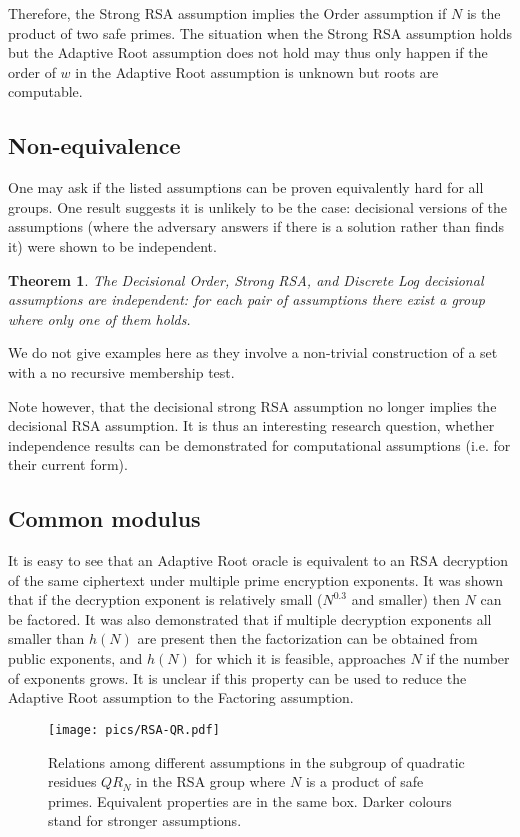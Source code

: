 \documentclass[a4paper]{article}
\newtheorem{theorem}{Theorem}
\begin{document}
Therefore, the Strong RSA assumption implies the Order assumption if $N$ is the product of two safe primes. The situation when the Strong RSA assumption holds but the Adaptive Root assumption does not hold may thus only happen if the order of $w$ in the Adaptive Root assumption is unknown but roots are computable. 

\subsection{Non-equivalence}

One may ask if the listed assumptions can be proven equivalently hard for all groups. One result suggests it is unlikely to be the case: decisional versions of the assumptions (where the adversary answers if there is a solution rather than finds it) were shown to be independent.
\begin{theorem}\cite{LM71,DBLP:conf/tcc/Rivest04} The Decisional Order,  Strong RSA, and Discrete Log decisional assumptions are independent: for each pair of assumptions there exist a group where only one of them holds.
\end{theorem}
We do not give examples here as they involve a non-trivial construction of a set with a no recursive membership test.

Note however, that the decisional strong RSA assumption no longer implies the decisional RSA assumption. It is thus an interesting research question, whether independence results can be demonstrated for computational assumptions (i.e. for their current form).

\subsection{Common modulus}
It is easy to see that an Adaptive Root oracle is equivalent to an RSA decryption of the same ciphertext under multiple prime encryption exponents. It was shown that if the decryption exponent is relatively small ($N^{0.3}$ and smaller) then $N$ can be factored. It was also demonstrated that if multiple decryption exponents all smaller than $h(N)$ are present then the factorization can be obtained from public exponents, and $h(N)$ for which it is feasible, approaches $N$ if the number of exponents grows. It is unclear if this property can be used to reduce the Adaptive Root assumption to the Factoring assumption.


\begin{figure}
    \centering
    \texttt{[image: pics/RSA-QR.pdf]}
    \caption{Relations among different assumptions in the subgroup of quadratic residues $QR_N$ in the RSA group where $N$ is a product of safe primes. Equivalent properties are in the same box. Darker colours stand for stronger assumptions.}
    \label{fig:rsa}
\end{figure}
\end{document}
